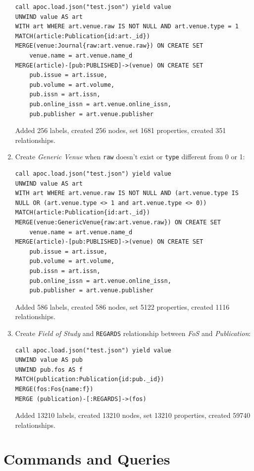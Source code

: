 \documentclass{Configuration_Files/PoliMi3i_thesis}
\begin{document}
\begin{enumerate}
        \begin{lstlisting}[language=cypher, label=lst:cypher-example]
call apoc.load.json("test.json") yield value
UNWIND value AS art
WITH art WHERE art.venue.raw IS NOT NULL AND art.venue.type = 1
MATCH(article:Publication{id:art._id})
MERGE(venue:Journal{raw:art.venue.raw}) ON CREATE SET
    venue.name = art.venue.name_d
MERGE(article)-[pub:PUBLISHED]->(venue) ON CREATE SET
    pub.issue = art.issue,
    pub.volume = art.volume,
    pub.issn = art.issn,
    pub.online_issn = art.venue.online_issn,
    pub.publisher = art.venue.publisher
        \end{lstlisting}
        Added 256 labels, created 256 nodes, set 1681 properties, created 351 relationships.
    \item Create \emph{Generic Venue} when \verb |raw| doesn't exist or \verb |type| different from 0 or 1:
        \begin{lstlisting}[language=cypher, label=lst:cypher-example]
call apoc.load.json("test.json") yield value
UNWIND value AS art
WITH art WHERE art.venue.raw IS NOT NULL AND (art.venue.type IS NULL OR (art.venue.type <> 1 and art.venue.type <> 0))
MATCH(article:Publication{id:art._id})
MERGE(venue:GenericVenue{raw:art.venue.raw}) ON CREATE SET
    venue.name = art.venue.name_d
MERGE(article)-[pub:PUBLISHED]->(venue) ON CREATE SET
    pub.issue = art.issue,
    pub.volume = art.volume,
    pub.issn = art.issn,
    pub.online_issn = art.venue.online_issn,
    pub.publisher = art.venue.publisher
        \end{lstlisting}
        Added 586 labels, created 586 nodes, set 5122 properties, created 1116 relationships.
    \item Create \emph{Field of Study} and \verb |REGARDS| relationship between \emph{FoS} and \emph{Publication}:
        \begin{lstlisting}[language=cypher, label=lst:cypher-example]
call apoc.load.json("test.json") yield value
UNWIND value AS pub
UNWIND pub.fos AS f
MATCH(publication:Publication{id:pub._id})
MERGE(fos:Fos{name:f})
MERGE (publication)-[:REGARDS]->(fos)
        \end{lstlisting}
        Added 13210 labels, created 13210 nodes, set 13210 properties, created 59740 relationships.
\end{enumerate}


\chapter{Commands and Queries}
\end{document}
